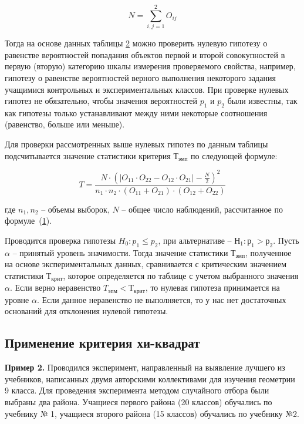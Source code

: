 \documentclass[12pt]{article}
\begin{document}
\begin{equation}
    \label{eq:sum-o}
    N=\sum_{i,j=1}^{2} O_{ij}
\end{equation}

Тогда на основе данных таблицы \hyperref[tbl:measurement-results]{2} можно проверить нулевую гипотезу о равенстве вероятностей попадания объектов первой и второй совокупностей в первую (вторую) категорию шкалы измерения проверяемого свойства, например, гипотезу о равенстве вероятностей верного выполнения некоторого задания учащимися контрольных и экспериментальных классов.
При проверке нулевых гипотез не обязательно, чтобы значения вероятностей $p_1$ и $p_2$ были известны, так как гипотезы только устанавливают между ними некоторые соотношения (равенство, больше или меньше).

Для проверки рассмотренных выше нулевых гипотез по данным таблицы подсчитывается значение статистики критерия $Т_{эмп}$ по следующей формуле:

\begin{equation}
    \label{eq:t}
    T=\frac{N\cdot (|O_{11} \cdot O_{22} -O_{12} \cdot O_{21}| - \frac{N}{2})^2}{n_1 \cdot n_2 \cdot (O_{11} + O_{21}) \cdot (O_{12} + O_{22})}
\end{equation}
                                            
где $n_1, n_2$ – объемы выборок, $N$ – общее число наблюдений, рассчитанное по формуле~(\hyperref[eq:sum-o]{1}).

Проводится проверка гипотезы $H_0: p_1 \leq p_2$, при альтернативе – $Н_1: р_1 > р_2$. Пусть $\alpha$ – принятый уровень значимости. Тогда значение статистики $Т_{эмп}$, полученное на основе экспериментальных данных, сравнивается с критическим значением статистики $Т_{крит}$, которое определяется по таблице  с учетом выбранного значения $\alpha$. Если верно неравенство $T_{эпм}<Т_{крит}$, то нулевая гипотеза принимается на уровне $\alpha$. Если данное неравенство не выполняется, то у нас нет достаточных оснований для отклонения нулевой гипотезы.

\medskip
\subsection{Применение критерия хи-квадрат}

\medskip
\textbf{Пример 2.} Проводился эксперимент, направленный на выявление лучшего из учебников, написанных двумя авторскими коллективами для изучения геометрии 9 класса. Для проведения эксперимента методом случайного отбора были выбраны два района. Учащиеся первого района (20 классов) обучались по учебнику № 1, учащиеся второго района (15 классов) обучались по учебнику №2.
\end{document}
